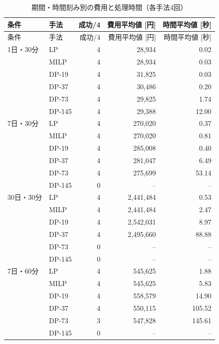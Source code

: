 \documentclass[a4paper,11pt,xelatex,ja=standard]{bxjsarticle}
\begin{document}
\begingroup
\small
\setlength{\tabcolsep}{3pt}
\begin{longtable}{llrrr}
    \caption{期間・時間刻み別の費用と処理時間（各手法4回）}\label{tab:period} \\
    \toprule
    条件      & 手法     & 成功/4 & 費用平均値 [円] & 時間平均値 [秒]     \\
    \midrule
    \endfirsthead
    \toprule
    条件      & 手法     & 成功/4 & 費用平均値 [円] & 時間平均値 [秒]     \\
    \midrule
    \endhead
    1日・30分  & LP     & 4    & 28,934    & 0.02          \\
            & MILP   & 4    & 28,934    & 0.03          \\
            & DP-19  & 4    & 31,825    & 0.03          \\
            & DP-37  & 4    & 30,486    & 0.20          \\
            & DP-73  & 4    & 29,825    & 1.74          \\
            & DP-145 & 4    & 29,388    & 12.00         \\
    \midrule
    7日・30分  & LP     & 4    & 270,020   & 0.37          \\
            & MILP   & 4    & 270,020   & 0.81          \\
            & DP-19  & 4    & 285,008   & 0.40          \\
            & DP-37  & 4    & 281,047   & 6.49          \\
            & DP-73  & 4    & 275,699   & 53.14         \\
            & DP-145 & 0    & --        & --            \\
    \midrule
    30日・30分 & LP     & 4    & 2,441,484 & 0.53          \\
            & MILP   & 4    & 2,441,484 & 2.47          \\
            & DP-19  & 4    & 2,542,031 & 8.97          \\
            & DP-37  & 4    & 2,495,660 & 88.88         \\
            & DP-73  & 0    & --        & --            \\
            & DP-145 & 0    & --        & --            \\
    \midrule
    7日・60分  & LP     & 4    & 545,625   & 1.88          \\
            & MILP   & 4    & 545,625   & 5.83          \\
            & DP-19  & 4    & 558,579   & 14.90         \\
            & DP-37  & 4    & 550,115   & 105.52        \\
            & DP-73  & 3    & 547,828   & 145.61        \\
            & DP-145 & 0    & --        & --            \\
    \bottomrule
\end{longtable}
\endgroup
\end{document}

